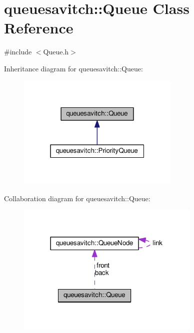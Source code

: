 \hypertarget{classqueuesavitch_1_1Queue}{}\section{queuesavitch\+:\+:Queue Class Reference}
\label{classqueuesavitch_1_1Queue}


{\ttfamily \#include $<$Queue.\+h$>$}



Inheritance diagram for queuesavitch\+:\+:Queue\+:
\nopagebreak
\begin{figure}[H]
\begin{center}
\leavevmode
\includegraphics[width=220pt]{classqueuesavitch_1_1Queue__inherit__graph}
\end{center}
\end{figure}


Collaboration diagram for queuesavitch\+:\+:Queue\+:
\nopagebreak
\begin{figure}[H]
\begin{center}
\leavevmode
\includegraphics[width=249pt]{classqueuesavitch_1_1Queue__coll__graph}
\end{center}
\end{figure}
